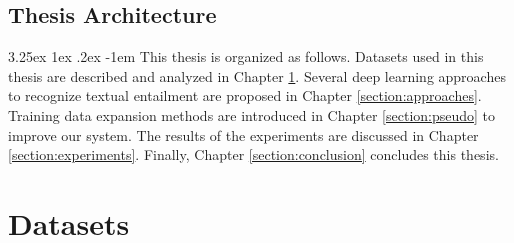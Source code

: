 \documentclass[12pt]{article}
\makeatletter
\renewcommand\paragraph{\@startsection{paragraph}{5}{\z@}%
  {3.25ex \@plus1ex \@minus.2ex}%
  {-1em}%
  {\normalfont\normalsize\bfseries}}
\makeatother
\begin{document}
\begin{CJK*}{UTF8}{bkai}
\begin{spacing}{1.77}


\subsection{Thesis Architecture}
\paragraph{}
This thesis is organized as follows. Datasets used in this thesis are described and analyzed in Chapter \ref{section:datasets}. Several deep learning approaches to recognize textual entailment are proposed in Chapter \ref{section:approaches}. Training data expansion methods are introduced in Chapter \ref{section:pseudo} to improve our system. The results of the experiments are discussed in Chapter \ref{section:experiments}. Finally, Chapter \ref{section:conclusion} concludes this thesis.

\section{Datasets} \label{section:datasets}


\end{spacing}
\end{CJK*}
\end{document}
